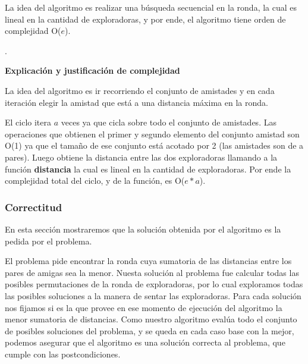 \documentclass[spanish,a4paper]{article}
\begin{document}
La idea del algoritmo es realizar una búsqueda secuencial en la ronda, la cual es lineal en la cantidad de 
exploradoras, y por ende, el algoritmo tiene orden de complejidad O($e$).

\noindent\makebox[\linewidth]{\rule{17cm}{0.4pt}}
.\\

\vspace{3mm}
\begin{center}
\textbf{Explicación y justificación de complejidad} \\ 
\end{center} 

La idea del algoritmo es ir recorriendo el conjunto de amistades y en cada iteración elegir la amistad que está   
a una distancia máxima en la ronda.

El ciclo itera $a$ veces ya que cicla sobre todo el conjunto de amistades. Las operaciones que obtienen el 
primer y segundo elemento del conjunto amistad son O(1) ya que el tamaño de ese conjunto está acotado por 
2 (las amistades son de a pares). Luego obtiene la distancia entre las dos exploradoras llamando a la 
función \textbf{distancia} la cual es lineal en la cantidad de exploradoras. Por ende la complejidad
total del ciclo, y de la función, es O($e*a$). 

\subsubsection{Correctitud}

En esta sección mostraremos que la solución obtenida por el algoritmo es la pedida por el problema. 

El problema pide encontrar la ronda cuya sumatoria de las distancias entre los pares de amigas sea la menor.
Nuesta solución al problema fue calcular todas las posibles permutaciones de la ronda de exploradoras, por lo cual 
exploramos todas las posibles soluciones a la manera de sentar las exploradoras. Para cada solución nos fijamos 
si es la que provee en ese momento de ejecución del algoritmo la menor sumatoria de distancias. Como nuestro 
algoritmo evalúa todo el conjunto de posibles soluciones del problema, y se queda en cada caso base con la mejor,
podemos asegurar que el algoritmo es una solución correcta al problema, que cumple con las postcondiciones.
\end{document}
